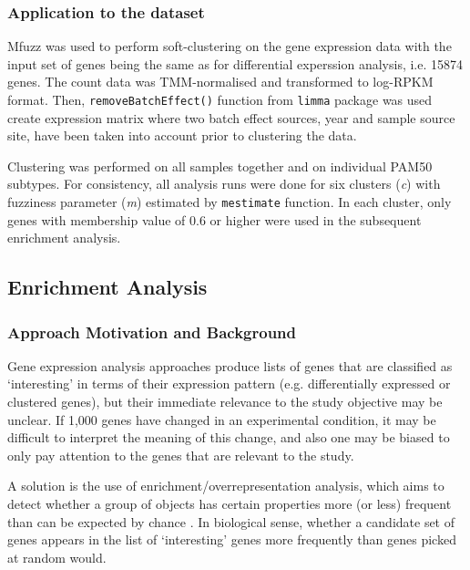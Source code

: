 \subsubsection{Application to the dataset}

Mfuzz was used to perform soft-clustering on the gene expression data with the input set of genes being the same as for differential experssion analysis, i.e. 15874 genes. The count data was TMM-normalised and transformed to log-RPKM format. Then, \texttt{removeBatchEffect()} function from \texttt{limma} package \cite{Ritchie2015LimmaStudies} was used create expression matrix where two batch effect sources, year and sample source site, have been taken into account prior to clustering the data. 

Clustering was performed on all samples together and on individual PAM50 subtypes. For consistency, all analysis runs were done for six clusters (\textit{c})  with fuzziness parameter (\textit{m}) estimated by \texttt{mestimate} function. In each cluster, only genes with membership value of 0.6 or higher were used in the subsequent enrichment analysis. 





    \newpage
    \subsection{Enrichment Analysis}
    
    
      \subsubsection{Approach Motivation and Background}
        Gene expression analysis approaches produce lists of genes that are classified as ‘interesting’ in terms of their expression pattern (e.g. differentially expressed or clustered genes), but their immediate relevance to the study objective may be unclear. If 1,000 genes have changed in an experimental condition, it may be difficult to interpret the meaning of this change, and also one may be biased to only pay attention to the genes that are relevant to the study. 

        A solution is the use of enrichment/overrepresentation analysis, which aims to detect whether a group of objects has certain properties more (or less) frequent than can be expected by chance \cite{Goeman2007AnalyzingIssues}. In biological sense, whether a candidate set of genes appears in the list of ‘interesting’ genes more frequently than genes picked at random would. 

